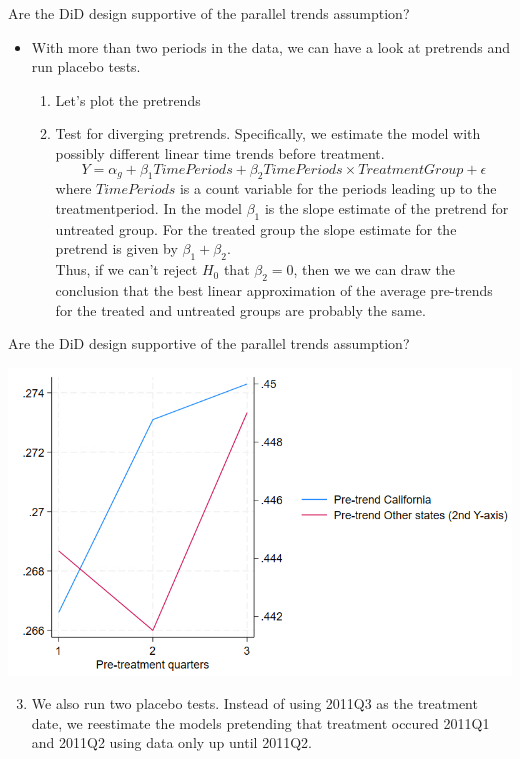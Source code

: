 \documentclass[notes,11pt, aspectratio=169]{beamer}
\begin{document}
\begin{frame}{Are the DiD design supportive of the parallel trends assumption?}
    \begin{itemize}
\item With more than two periods in the data, we can have a look at pretrends and run placebo tests. 
\begin{enumerate}
    \item Let's plot the pretrends
    \item Test for diverging pretrends. Specifically, we estimate the model with possibly different linear time trends before treatment. 
    \begin{equation}
    Y = \alpha_g + \beta_1 TimePeriods +\beta_2 TimePeriods\times TreatmentGroup + \epsilon 
    \end{equation}
    where $TimePeriods$ is a count variable for the periods leading up to the treatmentperiod. In the model $\beta_1$ is the slope estimate of the pretrend for untreated group. For the treated group the slope estimate for the pretrend is given by  $\beta_1 + \beta_2$.\\
    \vspace{0.2cm}
    Thus, if we can't reject $H_0$ that $\beta_2=0$, then we we can draw the conclusion that the best linear approximation of the average pre-trends for the treated and untreated groups are probably the same.
\end{enumerate}
\end{itemize}
\end{frame}

\begin{frame}{Are the DiD design supportive of the parallel trends assumption?}
    \begin{center}
        \includegraphics[width=0.55\linewidth]{24_DiDLecture/24_DiDLecture_PreTrend.png}
    \end{center}
\begin{enumerate}
  \setcounter{enumi}{2}    
    \item We also run two placebo tests. Instead of using 2011Q3 as the treatment date, we reestimate the models pretending that treatment occured 2011Q1 and 2011Q2 using data only up until 2011Q2.
\end{enumerate}
\end{frame}
\end{document}
